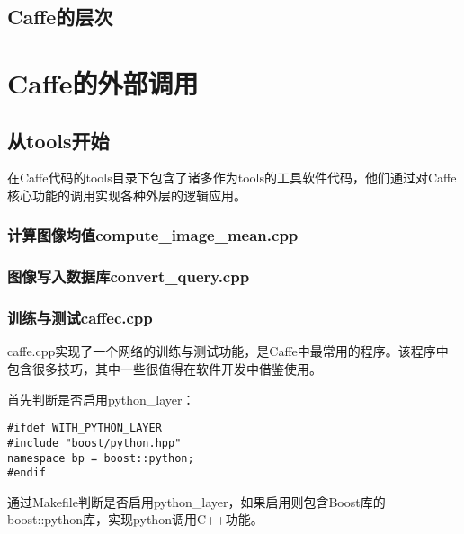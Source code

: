 \documentclass{NanCNBook}
\begin{document}
\chapter{Caffe的层次}

\part{Caffe的外部调用}

\chapter{从tools开始}
在Caffe代码的tools目录下包含了诸多作为tools的工具软件代码，他们通过对Caffe核心功能的调用实现各种外层的逻辑应用。

\section{计算图像均值compute\_image\_mean.cpp}

\section{图像写入数据库convert\_query.cpp}

\section{训练与测试caffec.cpp}
caffe.cpp实现了一个网络的训练与测试功能，是Caffe中最常用的程序。该程序中包含很多技巧，其中一些很值得在软件开发中借鉴使用。


首先判断是否启用python\_layer：
\begin{verbatim}
#ifdef WITH_PYTHON_LAYER
#include "boost/python.hpp"
namespace bp = boost::python;
#endif
\end{verbatim}
通过Makefile判断是否启用python\_layer，如果启用则包含Boost库的boost::python库，实现python调用C++功能。
\end{document}
